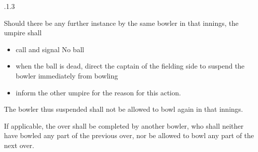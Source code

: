 \documentclass[12pt]{article}
\begin{document}
\vspace{\baselineskip}
\begin{adjustwidth}{0.49in}{0.0in}
{\fontsize{9pt}{10.8pt}.1.3 \tabto{1.17in} {\fontsize{8pt}{9.6pt}\selectfont Should there be any further instance by the same bowler in that innings, the umpire shall\par}\par}\par

\end{adjustwidth}


\vspace{\baselineskip}
\begin{itemize}
	\item {\fontsize{9pt}{10.8pt}\selectfont call and signal No ball\par}\par


\vspace{\baselineskip}
	\item {\fontsize{9pt}{10.8pt}\selectfont when the ball is dead, direct the captain of the fielding side to suspend the bowler immediately from bowling\par}\par


\vspace{\baselineskip}
	\item {\fontsize{9pt}{10.8pt}\selectfont inform the other umpire for the reason for this action.\par}
\end{itemize}\par


\vspace{\baselineskip}
\begin{adjustwidth}{1.12in}{0.0in}
{\fontsize{9pt}{10.8pt}\selectfont The bowler thus suspended shall not be allowed to bowl again in that innings.\par}\par

\end{adjustwidth}


\vspace{\baselineskip}
\begin{adjustwidth}{1.12in}{0.1in}
{\fontsize{9pt}{10.8pt}\selectfont If applicable, the over shall be completed by another bowler, who shall neither have bowled any part of the previous over, nor be allowed to bowl any part of the next over.\par}\par

\end{adjustwidth}
\end{document}
